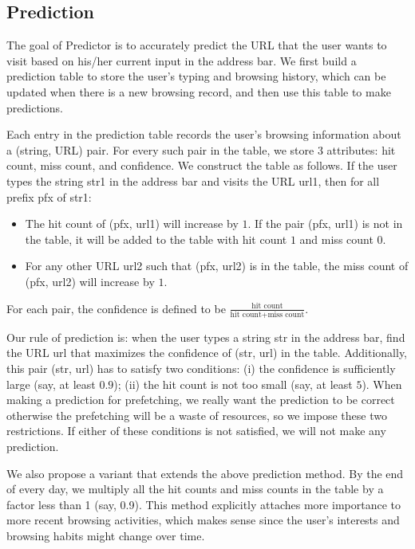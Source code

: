 \subsection{Prediction}

The goal of Predictor is to accurately predict the URL that the user wants to visit based on his/her current input in the address bar. We first build a prediction table to store the user's typing and browsing history, which can be updated when there is a new browsing record, and then use this table to make predictions.

Each entry in the prediction table records the user's browsing information about a (string, URL) pair. For every such pair in the table, we store 3 attributes: hit count, miss count, and confidence. We construct the table as follows. If the user types the string \textsf{str1} in the address bar and visits the URL \textsf{url1}, then for all prefix \textsf{pfx} of \textsf{str1}:
\begin{itemize}
	\item The hit count of (\textsf{pfx}, \textsf{url1}) will increase by $1$. If the pair (\textsf{pfx}, \textsf{url1}) is not in the table, it will be added to the table with hit count $1$ and miss count $0$.
	\item For any other URL \textsf{url2} such that (\textsf{pfx}, \textsf{url2}) is in the table, the miss count of (\textsf{pfx}, \textsf{url2}) will increase by $1$.
\end{itemize}
For each pair, the confidence is defined to be $\frac{\text{hit count}}{\text{hit count} + \text{miss count}}$.

Our rule of prediction is: when the user types a string \textsf{str} in the address bar, find the URL \textsf{url} that maximizes the confidence of (\textsf{str}, \textsf{url}) in the table. Additionally, this pair (\textsf{str}, \textsf{url}) has to satisfy two conditions: (i) the confidence is sufficiently large (say, at least $0.9$); (ii) the hit count is not too small (say, at least $5$).
When making a prediction for prefetching, we really want the prediction to be correct otherwise the prefetching will be a waste of resources, so we impose these two restrictions. If either of these conditions is not satisfied, we will not make any prediction.

We also propose a variant that extends the above prediction method. By the end of every day, we multiply all the hit counts and miss counts in the table by a factor less than 1 (say, 0.9). This method explicitly attaches more importance to more recent browsing activities, which makes sense since the user's interests and browsing habits might change over time.



